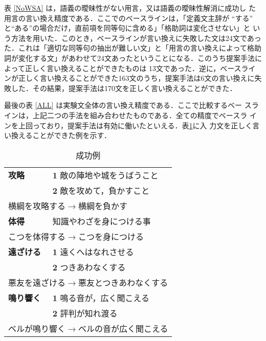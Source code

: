 表 \ref{NoWSA} は，語義の曖昧性がない用言，又は語義の曖昧性解消に成功し
た用言の言い換え精度である．ここでのベースラインは，「定義文主辞が
“する”
と“ある”の場合だけ，直前項を同等句に含める」「格助詞は変化させない」と
いう方法を用いた．このとき，ベースラインが言い換えに失敗した文は24文であっ
た．これは「適切な同等句の抽出が難しい文」と「用言の言い換えによって格助
詞が変化する文」があわせて24文あったということになる．このうち提案手法に
よって正しく言い換えることができたものは 13文であった．逆に，ベースライ
ンが正しく言い換えることができた163文のうち，提案手法は6文の言い換えに失
敗した．その結果，提案手法は170文を正しく言い換えることができた．

最後の表 \ref{ALL} は実験文全体の言い換え精度である．ここで比較するベー
スラインは，上記二つの手法を組み合わせたものである．全ての精度でベースラ
インを上回っており，提案手法は有効に働いたといえる．表\ref{succeed}に入
力文を正しく言い換えることができた例を示す．


\begin{table}
 \caption{成功例}
 \label{succeed}
\begin{center}
\begin{tabular}{@{}l@{}l@{}} \\ \hline
{ \bf 攻略 } & {\bf 1} 敵の陣地や城をうばうこと \\ 
             & {\bf 2} 敵を攻めて，負かすこと \\ [3pt]
\multicolumn{2}{l}{横綱を攻略する$\rightarrow$横綱を負かす}\\ [3pt] \hline 
{ \bf 体得 } & 知識やわざを身につける事 \\ [3pt]
\multicolumn{2}{l}{こつを体得する$\rightarrow$こつを身につける} \\ [3pt] \hline
{ \bf 遠ざける } & { \bf 1 } 遠くへはなれさせる \\
                 & { \bf 2 } つきあわなくする   \\ [3pt]
\multicolumn{2}{l}{悪友を遠ざける$\rightarrow$悪友とつきあわなくする} \\ [3pt] \hline
{ \bf 鳴り響く } & { \bf 1 } 鳴る音が，広く聞こえる \\
                 & { \bf 2 } 評判が知れ渡る         \\ [3pt]
\multicolumn{2}{l}{ベルが鳴り響く$\rightarrow$ベルの音が広く聞こえる} \\ [3pt] \hline
\end{tabular}
\end{center}
\end{table}




